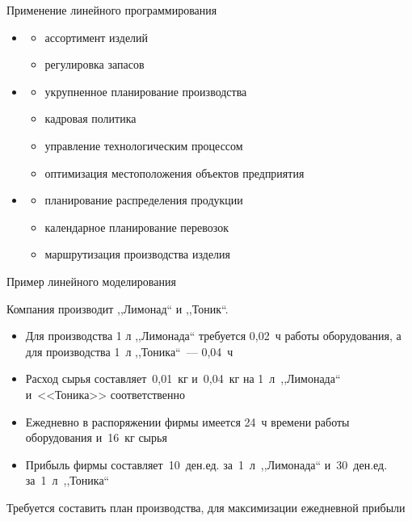 \documentclass[unicode,11pt,notheorems]{beamer}
\begin{document}
	\begin{frame}{Применение линейного программирования}
		\begin{itemize}
			\item {} 
			\begin{itemize}
				\item ассортимент изделий
				\item регулировка запасов
			\end{itemize}
			\item {} 
			\begin{itemize}
				\item укрупненное планирование производства
				\item кадровая политика
				\item управление технологическим процессом
				\item оптимизация местоположения объектов предприятия
			\end{itemize}
			\item {} 
			\begin{itemize}
				\item планирование распределения продукции
				\item календарное планирование перевозок
				\item маршрутизация производства изделия
			\end{itemize}
		\end{itemize}
	\end{frame}
	
	
	
	
	\begin{frame}{Пример линейного моделирования}{}
		
		Компания производит ,,Лимонад`` и ,,Тоник``.
		\begin{itemize}
			\item Для производства 1 л ,,Лимонада`` требуется 0,02~ч работы оборудования, 
			а для производства 1~л ,,Тоника``~--- 0,04~ч
			
			\item Расход сырья составляет~0,01~кг и~0,04~кг на 1~л~,,Лимонада`` и~<<Тоника>> соответственно
			
			\item Ежедневно в распоряжении фирмы имеется 24~ч времени работы оборудования и~16~кг сырья
			
			\item Прибыль фирмы составляет~10~ден.\;ед. за~1~л~,,Лимонада`` и~30~ден.\;ед. за~1~л~,,Тоника``
		\end{itemize}
		
		\alert{Требуется составить  план производства, для максимизации ежедневной прибыли}
	\end{frame}
	
\end{document}
